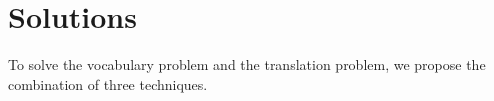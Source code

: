 \documentclass[manuscript,screen,review]{acmart}
\begin{document}
\section{Solutions}


To solve the vocabulary problem and the translation problem,
we propose the combination of three techniques.
\end{document}
